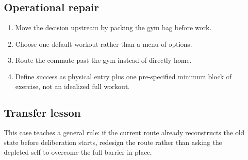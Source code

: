 \subsection*{Operational repair}
\begin{enumerate}[nosep]
  \item Move the decision upstream by packing the gym bag before work.
  \item Choose one default workout rather than a menu of options.
  \item Route the commute past the gym instead of directly home.
  \item Define success as physical entry plus one pre-specified minimum block
        of exercise, not an idealized full workout.
\end{enumerate}

\subsection*{Transfer lesson}
This case teaches a general rule: if the current route already reconstructs
the old state before deliberation starts, redesign the route rather than asking
the depleted self to overcome the full barrier in place.
